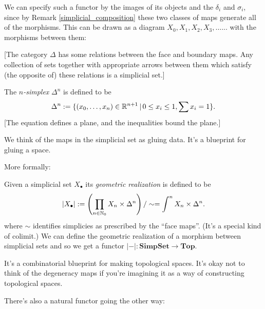 \documentclass[class=report, crop=false,a4paper,twoside]{standalone}
\begin{document}
We can specify such a functor by the images of its objects and the $\delta_i$ and $\sigma_i$, since by Remark \ref{simplicial_composition} these two classes of maps generate all of the morphisms. This can be drawn as a diagram $X_0, X_1,X_2,X_3,\dots...$ with the morphisms between them:
\begin{center}
\end{center}

[The category $\Delta$ has some relations between the face and boundary maps. Any collection of sets together with appropriate arrows between them which satisfy (the opposite of) these relations is a simplicial set.]

\begin{definition}
	The \emph{$n$-simplex} $\Delta^n$ is defined to be
	\[
	\Delta^n := \{(x_0,\dots,x_n) \in \mathbb{R}^{n+1}\,|\, 0 \le x_i \le 1, \sum x_i = 1\}.
	\]
	[The equation defines a plane, and the inequalities bound the plane.]
\end{definition}

We think of the maps in the simplicial set as gluing data. It's a blueprint for gluing a space.

More formally:
\begin{definition}
	Given a simplicial set $X_\bullet$ its \emph{geometric realization} is defined to be
	\[
	|X_\bullet| := \left(\prod_{n \in \mathbb{N}_0} X_n \times \Delta^n\right)/\sim = \int^n X_n \times \Delta^n.
	\]
	where $\sim$ identifies simplicies as prescribed by the ``face maps''. (It's a special kind of colimit.) We can define the geometric realization of a morphism between simplicial sets and so we get a functor $|-|: \mathbf{SimpSet} \to \mathbf{Top}$. 
\end{definition}

It's a combinatorial blueprint for making topological spaces. It's okay not to think of the degeneracy maps if you're imagining it as a way of constructing topological spaces.

There's also a natural functor going the other way:
\end{document}
